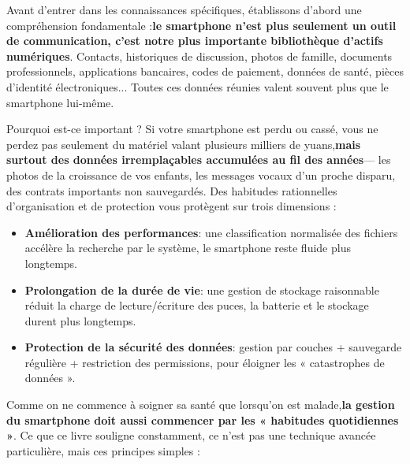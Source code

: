 
Avant d'entrer dans les connaissances spécifiques, établissons d'abord une compréhension fondamentale :\textbf{le smartphone n'est plus seulement un outil de communication, c'est notre plus importante bibliothèque d'actifs numériques}. Contacts, historiques de discussion, photos de famille, documents professionnels, applications bancaires, codes de paiement, données de santé, pièces d'identité électroniques... Toutes ces données réunies valent souvent plus que le smartphone lui-même.

\begin{tcbinfo}{Pourquoi est-ce important ?}
Si votre smartphone est perdu ou cassé, vous ne perdez pas seulement du matériel valant plusieurs milliers de yuans,\textbf{mais surtout des données irremplaçables accumulées au fil des années}— les photos de la croissance de vos enfants, les messages vocaux d'un proche disparu, des contrats importants non sauvegardés. Des habitudes rationnelles d'organisation et de protection vous protègent sur trois dimensions :

\begin{itemize}
  \item \textbf{Amélioration des performances}: une classification normalisée des fichiers accélère la recherche par le système, le smartphone reste fluide plus longtemps.
  \item \textbf{Prolongation de la durée de vie}: une gestion de stockage raisonnable réduit la charge de lecture/écriture des puces, la batterie et le stockage durent plus longtemps.
  \item \textbf{Protection de la sécurité des données}: gestion par couches + sauvegarde régulière + restriction des permissions, pour éloigner les « catastrophes de données ».
\end{itemize}

\end{tcbinfo}


Comme on ne commence à soigner sa santé que lorsqu'on est malade,\textbf{la gestion du smartphone doit aussi commencer par les « habitudes quotidiennes »}. Ce que ce livre souligne constamment, ce n'est pas une technique avancée particulière, mais ces principes simples :


